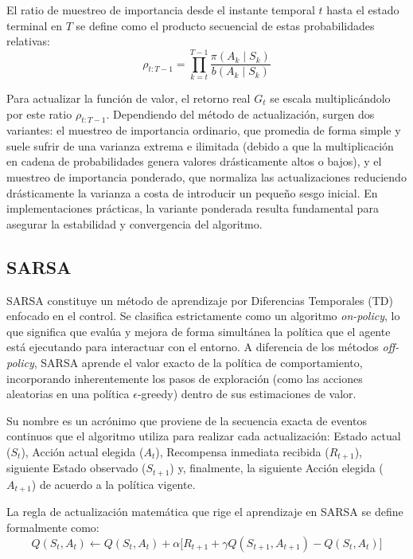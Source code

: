 El ratio de muestreo de importancia desde el instante temporal $t$ hasta el estado terminal en $T$ se define como el producto secuencial de estas probabilidades relativas:
\begin{equation}
\rho_{t:T-1} = \prod_{k=t}^{T-1} \frac{\pi(A_k \mid S_k)}{b(A_k \mid S_k)}
\end{equation}

Para actualizar la función de valor, el retorno real $G_t$ se escala multiplicándolo por este ratio $\rho_{t:T-1}$. Dependiendo del método de actualización, surgen dos variantes: el muestreo de importancia ordinario, que promedia de forma simple y suele sufrir de una varianza extrema e ilimitada (debido a que la multiplicación en cadena de probabilidades genera valores drásticamente altos o bajos), y el muestreo de importancia ponderado, que normaliza las actualizaciones reduciendo drásticamente la varianza a costa de introducir un pequeño sesgo inicial. En implementaciones prácticas, la variante ponderada resulta fundamental para asegurar la estabilidad y convergencia del algoritmo.

\subsection{SARSA}

SARSA constituye un método de aprendizaje por Diferencias Temporales (TD) enfocado en el control. Se clasifica estrictamente como un algoritmo \textit{on-policy}, lo que significa que evalúa y mejora de forma simultánea la política que el agente está ejecutando para interactuar con el entorno. A diferencia de los métodos \textit{off-policy}, SARSA aprende el valor exacto de la política de comportamiento, incorporando inherentemente los pasos de exploración (como las acciones aleatorias en una política $\epsilon$-greedy) dentro de sus estimaciones de valor.

Su nombre es un acrónimo que proviene de la secuencia exacta de eventos continuos que el algoritmo utiliza para realizar cada actualización: Estado actual ($S_t$), Acción actual elegida ($A_t$), Recompensa inmediata recibida ($R_{t+1}$), siguiente Estado observado ($S_{t+1}$) y, finalmente, la siguiente Acción elegida ($A_{t+1}$) de acuerdo a la política vigente. 

La regla de actualización matemática que rige el aprendizaje en SARSA se define formalmente como:
\begin{equation*}
Q(S_t, A_t) \leftarrow Q(S_t, A_t) + \alpha \Big[ R_{t+1} + \gamma Q(S_{t+1}, A_{t+1}) - Q(S_t, A_t) \Big]
\end{equation*}

